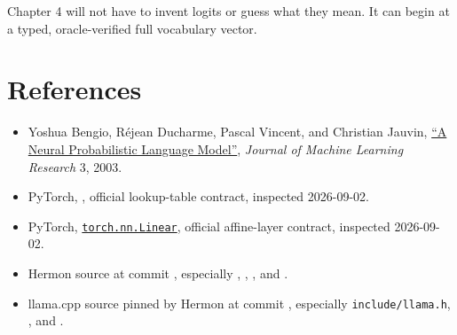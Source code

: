 Chapter 4 will not have to invent logits or guess what they mean. It can
begin at a typed, oracle-verified full vocabulary vector.

\section{References}\label{references}

\begin{itemize}
\tightlist
\item
  Yoshua Bengio, Réjean Ducharme, Pascal Vincent, and Christian Jauvin,
  \href{https://jmlr.org/papers/v3/bengio03a.html}{``A Neural
  Probabilistic Language Model''}, \emph{Journal of Machine Learning
  Research} 3, 2003.
\item
PyTorch,
  \href{https://docs.pytorch.org/docs/stable/generated/torch.nn.Embedding}{\texttt{}},
  official lookup-table contract, inspected 2026-09-02.
\item
PyTorch,
  \href{https://docs.pytorch.org/docs/stable/generated/torch.nn.Linear.html}{\texttt{torch.nn.Linear}},
  official affine-layer contract, inspected 2026-09-02.
\item
  Hermon source at commit
  \texttt{},
  especially \texttt{},
  \texttt{},
  \texttt{}, and
  \texttt{}.
\item
  llama.cpp source pinned by Hermon at commit
  \texttt{},
  especially \texttt{include/llama.h},
  \texttt{}, and
  \texttt{}.
\end{itemize}



